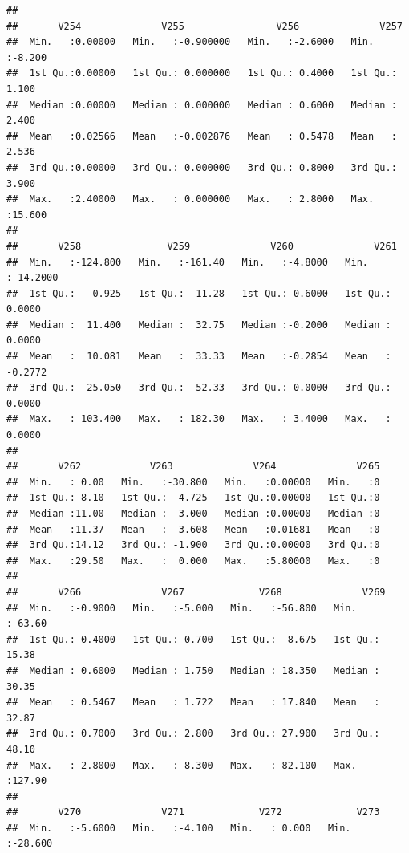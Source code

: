 \documentclass[
]{article}
\begin{document}
\begin{verbatim}
##                                                                           
##       V254              V255                V256              V257       
##  Min.   :0.00000   Min.   :-0.900000   Min.   :-2.6000   Min.   :-8.200  
##  1st Qu.:0.00000   1st Qu.: 0.000000   1st Qu.: 0.4000   1st Qu.: 1.100  
##  Median :0.00000   Median : 0.000000   Median : 0.6000   Median : 2.400  
##  Mean   :0.02566   Mean   :-0.002876   Mean   : 0.5478   Mean   : 2.536  
##  3rd Qu.:0.00000   3rd Qu.: 0.000000   3rd Qu.: 0.8000   3rd Qu.: 3.900  
##  Max.   :2.40000   Max.   : 0.000000   Max.   : 2.8000   Max.   :15.600  
##                                                                          
##       V258               V259              V260              V261         
##  Min.   :-124.800   Min.   :-161.40   Min.   :-4.8000   Min.   :-14.2000  
##  1st Qu.:  -0.925   1st Qu.:  11.28   1st Qu.:-0.6000   1st Qu.:  0.0000  
##  Median :  11.400   Median :  32.75   Median :-0.2000   Median :  0.0000  
##  Mean   :  10.081   Mean   :  33.33   Mean   :-0.2854   Mean   : -0.2772  
##  3rd Qu.:  25.050   3rd Qu.:  52.33   3rd Qu.: 0.0000   3rd Qu.:  0.0000  
##  Max.   : 103.400   Max.   : 182.30   Max.   : 3.4000   Max.   :  0.0000  
##                                                                           
##       V262            V263              V264              V265  
##  Min.   : 0.00   Min.   :-30.800   Min.   :0.00000   Min.   :0  
##  1st Qu.: 8.10   1st Qu.: -4.725   1st Qu.:0.00000   1st Qu.:0  
##  Median :11.00   Median : -3.000   Median :0.00000   Median :0  
##  Mean   :11.37   Mean   : -3.608   Mean   :0.01681   Mean   :0  
##  3rd Qu.:14.12   3rd Qu.: -1.900   3rd Qu.:0.00000   3rd Qu.:0  
##  Max.   :29.50   Max.   :  0.000   Max.   :5.80000   Max.   :0  
##                                                                 
##       V266              V267             V268              V269       
##  Min.   :-0.9000   Min.   :-5.000   Min.   :-56.800   Min.   :-63.60  
##  1st Qu.: 0.4000   1st Qu.: 0.700   1st Qu.:  8.675   1st Qu.: 15.38  
##  Median : 0.6000   Median : 1.750   Median : 18.350   Median : 30.35  
##  Mean   : 0.5467   Mean   : 1.722   Mean   : 17.840   Mean   : 32.87  
##  3rd Qu.: 0.7000   3rd Qu.: 2.800   3rd Qu.: 27.900   3rd Qu.: 48.10  
##  Max.   : 2.8000   Max.   : 8.300   Max.   : 82.100   Max.   :127.90  
##                                                                       
##       V270              V271             V272             V273        
##  Min.   :-5.6000   Min.   :-4.100   Min.   : 0.000   Min.   :-28.600  

\end{verbatim}
\end{document}
